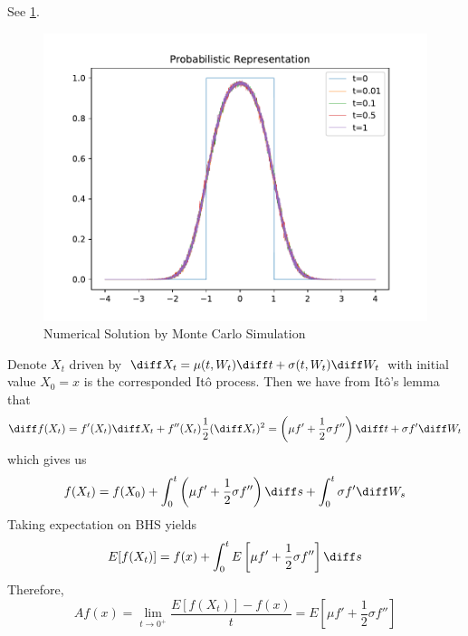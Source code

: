\begin{subproblem}
    \item
    See \cref{fig:prob sol}.
    \begin{figure}[h]
        \centering
        \includegraphics[width=\textwidth]{prob-sol}
        \caption{Numerical Solution by Monte Carlo Simulation}
        \label{fig:prob sol}
    \end{figure}
\end{subproblem}

\problem
Denote $X_t$ driven by $\diff X_t=\mu(t,W_t)\diff t+\sigma(t,W_t)\diff W_t$
with initial value $X_0=x$
is the corresponded It\^o process. Then we have from It\^o's lemma
that
\[\diff f(X_t)=f'(X_t)\diff X_t+f''(X_t)\frac{1}{2}(\diff X_t)^2
=\left(\mu f'+\frac{1}{2}\sigma f''\right)\diff t+\sigma f'\diff W_t\]
which gives us
\[f(X_t)=f(X_0)+\int_0^t\left(\mu f'+\frac{1}{2}\sigma f''\right)\diff s
+\int_0^t\sigma f'\diff W_s\]
Taking expectation on BHS yields
\[E[f(X_t)]=f(x)+\int_0^tE\left[\mu f'+\frac{1}{2}\sigma f''\right]\diff s\]
Therefore,
\[Af(x)=\lim_{t\to 0^+}\frac{E[f(X_t)]-f(x)}{t}
=E\left[\mu f'+\frac{1}{2}\sigma f''\right]\]

\problem

